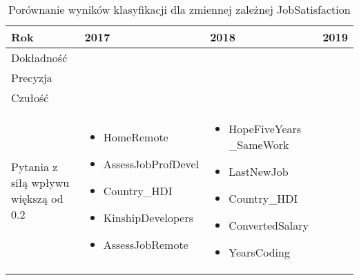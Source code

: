 \noindent\begin{minipage}{\textwidth}
             \begin{table}[H]
                 \raggedright\caption{Porównanie wyników klasyfikacji dla zmiennej zależnej JobSatisfaction\label{tabela:JobSatisfactionClassification}}
                 \begin{center}
                     \begin{tabular}{|P{.1\textwidth}|P{.26\textwidth}|P{.26\textwidth}|P{.26\textwidth}|}

                         \hline
                         Rok        & 2017             & 2018             & 2019             \\
                         \hline
                         Dokładność &  &   &   \\
                         \hline
                         Precyzja   &  &   &   \\
                         \hline
                         Czułość    &  &  &  \\
                         \hline
                         Pytania z siłą wpływu większą od 0.2 &
                         \begin{itemize}
                             \item HomeRemote
                             \item AssessJobProfDevel
                             \item Country\_HDI
                             \item KinshipDevelopers
                             \item AssessJobRemote
                         \end{itemize} &
                         \begin{itemize}
                             \item HopeFiveYears \_SameWork
                             \item LastNewJob
                             \item Country\_HDI
                             \item ConvertedSalary
                             \item YearsCoding
                         \end{itemize} &
                         \begin{itemize}

\end{itemize}
\end{tabular}
\end{center}
\end{table}
\end{minipage}
